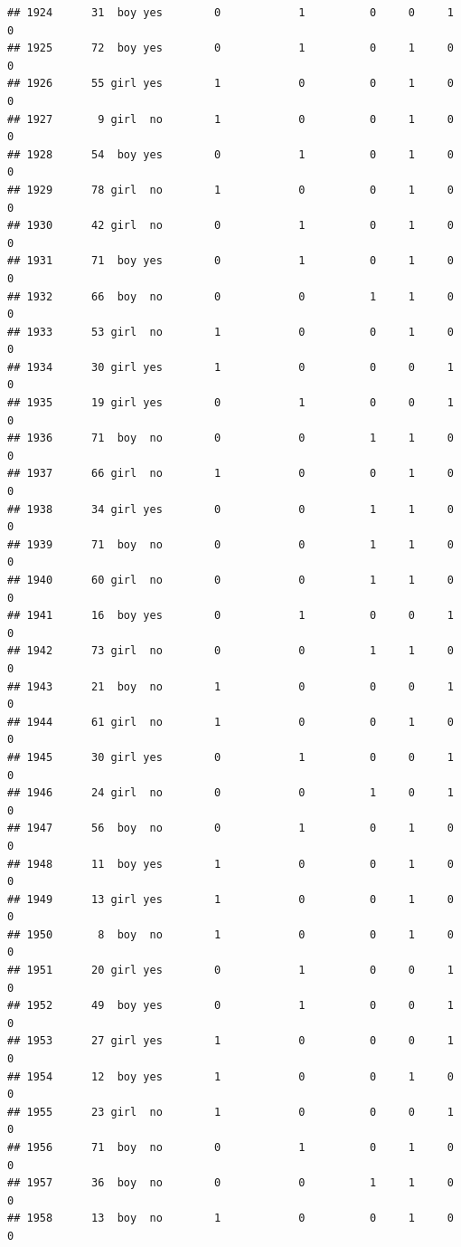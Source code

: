 \documentclass[man]{apa6}
\begin{document}
\begin{verbatim}
## 1924      31  boy yes        0            1          0     0     1     0
## 1925      72  boy yes        0            1          0     1     0     0
## 1926      55 girl yes        1            0          0     1     0     0
## 1927       9 girl  no        1            0          0     1     0     0
## 1928      54  boy yes        0            1          0     1     0     0
## 1929      78 girl  no        1            0          0     1     0     0
## 1930      42 girl  no        0            1          0     1     0     0
## 1931      71  boy yes        0            1          0     1     0     0
## 1932      66  boy  no        0            0          1     1     0     0
## 1933      53 girl  no        1            0          0     1     0     0
## 1934      30 girl yes        1            0          0     0     1     0
## 1935      19 girl yes        0            1          0     0     1     0
## 1936      71  boy  no        0            0          1     1     0     0
## 1937      66 girl  no        1            0          0     1     0     0
## 1938      34 girl yes        0            0          1     1     0     0
## 1939      71  boy  no        0            0          1     1     0     0
## 1940      60 girl  no        0            0          1     1     0     0
## 1941      16  boy yes        0            1          0     0     1     0
## 1942      73 girl  no        0            0          1     1     0     0
## 1943      21  boy  no        1            0          0     0     1     0
## 1944      61 girl  no        1            0          0     1     0     0
## 1945      30 girl yes        0            1          0     0     1     0
## 1946      24 girl  no        0            0          1     0     1     0
## 1947      56  boy  no        0            1          0     1     0     0
## 1948      11  boy yes        1            0          0     1     0     0
## 1949      13 girl yes        1            0          0     1     0     0
## 1950       8  boy  no        1            0          0     1     0     0
## 1951      20 girl yes        0            1          0     0     1     0
## 1952      49  boy yes        0            1          0     0     1     0
## 1953      27 girl yes        1            0          0     0     1     0
## 1954      12  boy yes        1            0          0     1     0     0
## 1955      23 girl  no        1            0          0     0     1     0
## 1956      71  boy  no        0            1          0     1     0     0
## 1957      36  boy  no        0            0          1     1     0     0
## 1958      13  boy  no        1            0          0     1     0     0

\end{verbatim}
\end{document}
